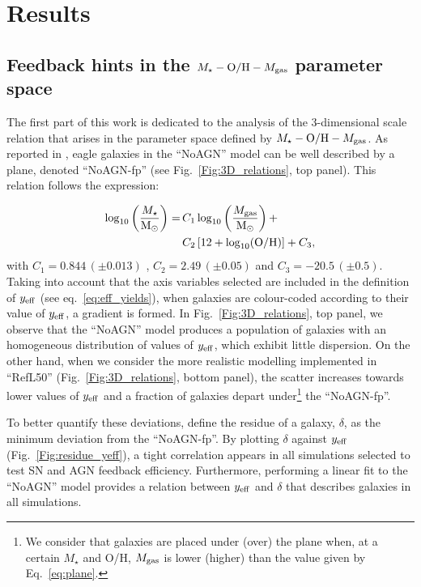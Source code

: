 \documentclass[baaa]{baaa}
\begin{document}
\section{Results}
\subsection{Feedback hints in the $M_\star - {\rm O/H} - M_{\rm gas}$ parameter space}
\label{Sec:3D_relation}
The first part of this work is dedicated to the analysis of the 3-dimensional scale relation that arises in the parameter space defined by $M_\star - {\rm O/H} - M_{\rm gas}$. As reported in \citet{Zerbo2024}, {\sc eagle} galaxies in the ``NoAGN'' model can be well described by a plane, denoted ``NoAGN-fp'' (see Fig.~\ref{Fig:3D_relations}, top panel). This relation follows the expression:

\begin{equation}
    \begin{aligned}
        \log_{10}{\left( \frac{M_\star}{\rm M_\odot} \right)} = \, &C_1 \log_{10}\left( \frac{M_{\rm gas}} {\rm M_\odot} \right) + \\ &C_2 \left[12 + \log_{10} ({\rm O/H})\right]  + C_3, \\
    \label{eq:plane} 
    \end{aligned}
\end{equation}
with $C_1 = 0.844 \, (\pm 0.013)$  , $C_2 = 2.49 \, (\pm 0.05)$ and $C_3 = -20.5 \,(\pm 0.5)$. Taking into account that the axis variables selected are included in the definition of $y_{\rm eff}$ (see eq.~\ref{eq:eff_yields}), when galaxies are colour-coded according to their value of $y_{\rm eff}$, a gradient is formed. In Fig.~\ref{Fig:3D_relations}, top panel, we observe that the ``NoAGN'' model produces a population of galaxies with an homogeneous distribution of values of $y_{\rm eff}$, which exhibit little dispersion. On the other hand, when we consider the more realistic modelling implemented in ``RefL50'' (Fig.~\ref{Fig:3D_relations}, bottom panel), the scatter increases towards lower values of $y_{\rm eff}$ and a fraction of galaxies depart under\footnote{We consider that galaxies are placed under
(over) the plane when, at a certain $M_\star$ and O/H, $M_{\rm gas}$ is lower (higher) than the value given by Eq.~\ref{eq:plane}.} the ``NoAGN-fp''.

To better quantify these deviations, \citet{Zerbo2024} define the residue of a galaxy, $\delta$, as the minimum deviation from the ``NoAGN-fp''. By plotting $\delta$ against $y_{\rm eff}$ (Fig.~\ref{Fig:residue_yeff}), a tight correlation appears in all simulations selected to test SN and AGN feedback efficiency. Furthermore, performing a linear fit to the ``NoAGN'' model provides a relation between $y_{\rm eff}$ and $\delta$ that describes galaxies in all simulations. 
\end{document}
